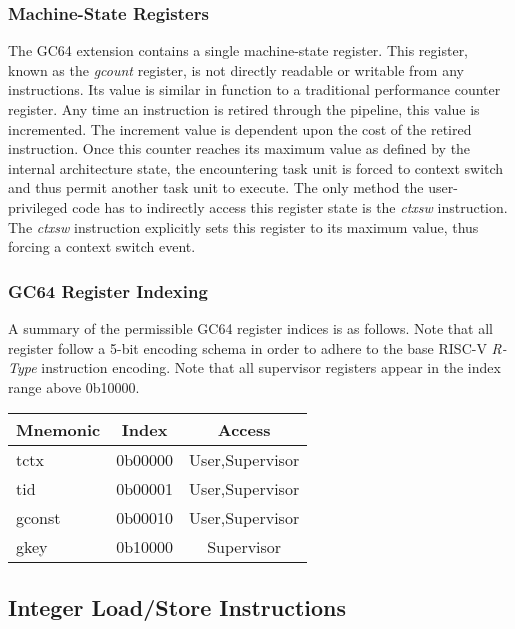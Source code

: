\documentclass{article}
\begin{document}
\subsubsection{Machine-State Registers}

The GC64 extension contains a single machine-state register.  This register, known as the \emph{gcount} register, is not directly readable or writable from any instructions.  Its value is similar in function to a traditional performance counter register.  Any time an instruction is retired through the pipeline, this value is incremented.  The increment value is dependent upon the cost of the retired instruction.  Once this counter reaches its maximum value as defined by the internal architecture state, the encountering task unit is forced to context switch and thus permit another task unit to execute.  The only method the user-privileged code has to indirectly access this register state is the \emph{ctxsw} instruction.  The \emph{ctxsw} instruction explicitly sets this register to its maximum value, thus forcing a context switch event.    

\newpage
\subsubsection{GC64 Register Indexing}
A summary of the permissible GC64 register indices is as follows.
Note that all register follow a 5-bit encoding schema in order to adhere
to the base RISC-V \emph{R-Type} instruction encoding.  
Note that all supervisor registers appear in the index range above 0b10000.

\begin{center}
\begin{tabular}{| l | c | c | }
\hline
Mnemonic & Index & Access \\ \hline
\hline
tctx & 0b00000 & User,Supervisor \\
\hline
tid & 0b00001 & User,Supervisor \\
\hline
gconst & 0b00010 & User,Supervisor \\
\hline
gkey & 0b10000 & Supervisor\\
\hline
\end{tabular}
\end{center}


\subsection{Integer Load/Store Instructions}
\end{document}
